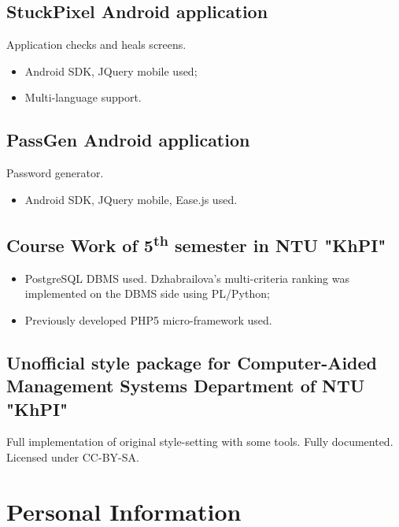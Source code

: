 \documentclass[11pt,a4paper,sans]{moderncv}        %
\begin{document}
\subsection{StuckPixel Android application~\href{https://play.google.com/store/apps/details?id=com.livich.stuckpixel}{\homepagesymbol}}

Application checks and heals screens.

\begin{itemize}%
	\item Android SDK, JQuery mobile used;
	\item Multi-language support.
\end{itemize}

\subsection{PassGen Android application~\href{https://play.google.com/store/apps/details?id=com.livich.passgen}{\homepagesymbol}}

Password generator.

\begin{itemize}%
	\item Android SDK, JQuery mobile, Ease.js used.
\end{itemize}

\subsection{Course Work of 5\textsuperscript{th} semester in NTU "KhPI"~\href{https://github.com/Livich/cw31}{\githubsocialsymbol}}
\begin{itemize}%
\item PostgreSQL DBMS used. Dzhabrailova's multi-criteria ranking was implemented on the DBMS side using PL/Python;
\item Previously developed PHP5 micro-framework used.
\end{itemize}

\subsection{Unofficial \LaTeXe{} style package for Computer-Aided Management Systems Department of NTU "KhPI"~\href{https://github.com/Livich/stvuz\_KhPI\_XeLaTeX}{\githubsocialsymbol}}
Full implementation of original style-setting with some tools. Fully documented. Licensed under CC-BY-SA.


\section{Personal Information}
\end{document}
